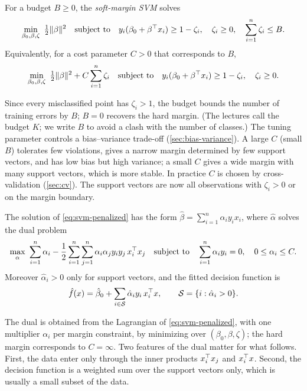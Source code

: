 \begin{definition}\label{def:soft-margin-svm}
For a budget $B\ge0$, the \emph{soft-margin SVM} solves
\[
\min_{\beta_0,\beta,\zeta}\ \tfrac12\norm\beta^2\quad\text{subject to}\quad y_i(\beta_0+\beta\T x_i)\ge1-\zeta_i,\quad\zeta_i\ge0,\quad\sum_{i=1}^n\zeta_i\le B.
\]
Equivalently, for a cost parameter $C>0$ that corresponds to $B$,
\begin{equation}\label{eq:svm-penalized}
\min_{\beta_0,\beta,\zeta}\ \tfrac12\norm\beta^2+C\sum_{i=1}^n\zeta_i\quad\text{subject to}\quad y_i(\beta_0+\beta\T x_i)\ge1-\zeta_i,\quad\zeta_i\ge0.
\end{equation}
\end{definition}

Since every misclassified point has $\zeta_i>1$, the budget bounds the number of training errors by $B$; $B=0$ recovers the hard margin. (The lectures call the budget $K$; we write $B$ to avoid a clash with the number of classes.) The tuning parameter controls a bias--variance trade-off (\cref{sec:bias-variance}). A large $C$ (small $B$) tolerates few violations, gives a narrow margin determined by few support vectors, and has low bias but high variance; a small $C$ gives a wide margin with many support vectors, which is more stable. In practice $C$ is chosen by cross-validation (\cref{sec:cv}). The support vectors are now all observations with $\zeta_i>0$ or on the margin boundary.

\begin{proposition}\label{prop:svm-dual}
The solution of \eqref{eq:svm-penalized} has the form $\hat\beta=\sum_{i=1}^n\hat\alpha_iy_ix_i$, where $\hat\alpha$ solves the dual problem
\[
\max_{\alpha}\ \sum_{i=1}^n\alpha_i-\frac12\sum_{i=1}^n\sum_{j=1}^n\alpha_i\alpha_jy_iy_j\,x_i\T x_j\quad\text{subject to}\quad\sum_{i=1}^n\alpha_iy_i=0,\quad0\le\alpha_i\le C.
\]
Moreover $\hat\alpha_i>0$ only for support vectors, and the fitted decision function is
\[
\hat f(x)=\hat\beta_0+\sum_{i\in\mathcal S}\hat\alpha_iy_i\,x_i^{\top} x,\qquad\mathcal S=\{i:\hat\alpha_i>0\}.
\]
\end{proposition}

The dual is obtained from the Lagrangian of \eqref{eq:svm-penalized}, with one multiplier $\alpha_i$ per margin constraint, by minimizing over $(\beta_0,\beta,\zeta)$; the hard margin corresponds to $C=\infty$. Two features of the dual matter for what follows. First, the data enter only through the inner products $x_i^{\top} x_j$ and $x_i^{\top} x$. Second, the decision function is a weighted sum over the support vectors only, which is usually a small subset of the data.

